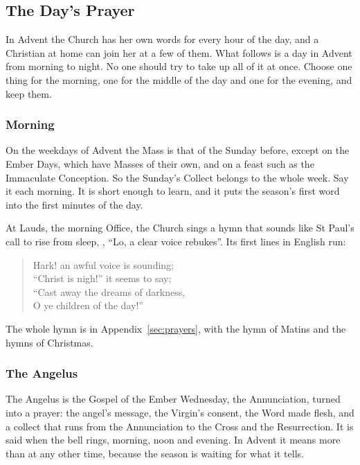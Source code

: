 \subsection{The Day's Prayer}\label{sec:prayer}

In Advent the Church has her own words for every hour of the day, and a
Christian at home can join her at a few of them. What follows is a day in
Advent from morning to night. No one should try to take up all of it at once.
Choose one thing for the morning, one for the middle of the day and one for
the evening, and keep them.

\subsubsection*{Morning}

On the weekdays of Advent the Mass is that of the Sunday before, except on the
Ember Days, which have Masses of their own, and on a feast such as the
Immaculate Conception. So the Sunday's Collect belongs to the whole week. Say it
each morning. It is short enough to learn, and it puts the season's first word
into the first minutes of the day.

At Lauds, the morning Office, the Church sings a hymn that sounds like St
Paul's call to rise from sleep, , ``Lo, a clear voice
rebukes''. Its first lines in English run:

\begin{verse}
Hark! an awful voice is sounding; \\
``Christ is nigh!'' it seems to say; \\
``Cast away the dreams of darkness, \\
O ye children of the day!''
\end{verse}

\noindent The whole hymn is in Appendix~\ref{sec:prayers}, with the hymn of
Matins and the hymns of Christmas.

\subsubsection*{The Angelus}

The Angelus is the Gospel of the Ember Wednesday, the Annunciation, turned into
a prayer: the angel's message, the Virgin's consent, the Word made flesh, and a
collect that runs from the Annunciation to the Cross and the Resurrection. It is
said when the bell rings, morning, noon and evening. In Advent it means more
than at any other time, because the season is waiting for what it tells.

